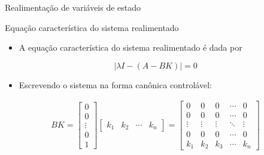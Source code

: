 \begin{frame}{Realimentação de variáveis de estado}
\begin{block}{Equação característica do sistema realimentado}
\begin{itemize}
    \item A equação característica do sistema realimentado é dada por
\end{itemize}
$$\boxed{|\lambda I - (A-BK)| =  0}$$
\begin{itemize}
    \item Escrevendo o sistema na forma canônica controlável:
\end{itemize}
\begin{align*}
    BK = \begin{bmatrix}
    0 \\ 0 \\ \vdots \\ 0 \\ 1
    \end{bmatrix}
    \begin{bmatrix}
    k_1 & k_2 & \cdots & k_n
    \end{bmatrix} = \begin{bmatrix}
    0 & 0 & 0 & \cdots & 0 \\
    0 & 0 & 0 & \cdots & 0 \\
    \vdots & \vdots & \vdots & \ddots & \vdots \\
    0 & 0 & 0 & \cdots & 0 \\
    k_1 & k_2 & k_3 & \cdots & k_n
    \end{bmatrix}
\end{align*}
\end{block}
\end{frame}

